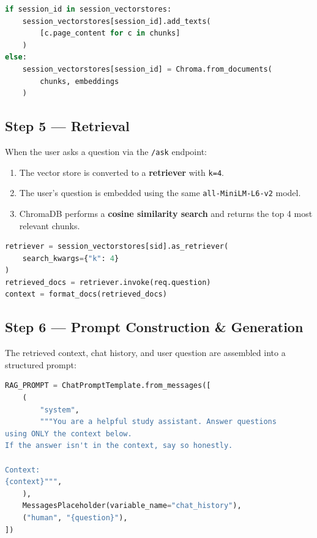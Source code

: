 \documentclass[12pt,a4paper]{article}
\begin{document}
\begin{lstlisting}[language=Python, caption={Vector store creation/update}]
if session_id in session_vectorstores:
    session_vectorstores[session_id].add_texts(
        [c.page_content for c in chunks]
    )
else:
    session_vectorstores[session_id] = Chroma.from_documents(
        chunks, embeddings
    )
\end{lstlisting}

\subsection{Step 5 — Retrieval}

When the user asks a question via the \texttt{/ask} endpoint:

\begin{enumerate}
  \item The vector store is converted to a \textbf{retriever} with \texttt{k=4}.
  \item The user's question is embedded using the same \texttt{all-MiniLM-L6-v2} model.
  \item ChromaDB performs a \textbf{cosine similarity search} and returns the top 4 most relevant chunks.
\end{enumerate}

\begin{lstlisting}[language=Python, caption={Retrieval}]
retriever = session_vectorstores[sid].as_retriever(
    search_kwargs={"k": 4}
)
retrieved_docs = retriever.invoke(req.question)
context = format_docs(retrieved_docs)
\end{lstlisting}

\subsection{Step 6 — Prompt Construction \& Generation}

The retrieved context, chat history, and user question are assembled into a structured prompt:

\begin{lstlisting}[language=Python, caption={RAG prompt template}]
RAG_PROMPT = ChatPromptTemplate.from_messages([
    (
        "system",
        """You are a helpful study assistant. Answer questions
using ONLY the context below.
If the answer isn't in the context, say so honestly.

Context:
{context}""",
    ),
    MessagesPlaceholder(variable_name="chat_history"),
    ("human", "{question}"),
])
\end{lstlisting}
\end{document}
